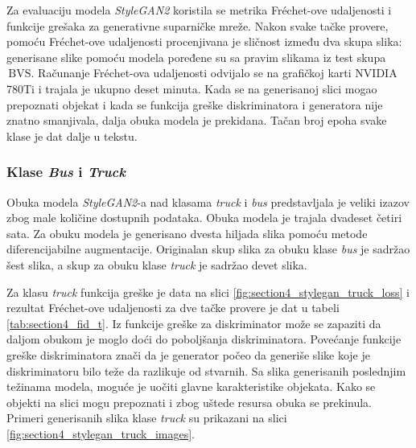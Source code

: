 \documentclass[12pt,oneside]{memoir}
\newcommand{\bvs}{\ensuremath{\,\textrm{BVS}}}
\begin{document}
Za evaluaciju modela \textit{StyleGAN2} koristila se metrika Fréchet-ove udaljenosti i funkcije grešaka za generativne suparničke mreže. Nakon svake tačke provere, pomoću Fréchet-ove udaljenosti procenjivana je sličnost između dva skupa slika: generisane slike pomoću modela poređene su sa pravim slikama iz test skupa \bvs. Računanje Fréchet-ova udaljenosti odvijalo se na grafičkoj karti NVIDIA 780Ti i trajala je ukupno deset minuta. Kada se na generisanoj slici mogao prepoznati objekat i kada se funkcija greške diskriminatora i generatora nije znatno smanjivala, dalja obuka modela je prekidana. Tačan broj epoha svake klase je dat dalje u tekstu.


\subsubsection{Klase \textit{Bus} i \textit{Truck}}

Obuka modela \textit{StyleGAN2}-a nad klasama \textit{truck} i \textit{bus} predstavljala je veliki izazov zbog male količine dostupnih podataka. 
Obuka modela je trajala dvadeset četiri sata. Za obuku modela je generisano dvesta hiljada slika pomoću metode diferencijabilne augmentacije. Originalan skup slika za obuku klase \textit{bus} je sadržao šest slika, a skup za obuku klase \textit{truck} je sadržao devet slika.


\clearpage
Za klasu \textit{truck} funkcija greške je data na slici \ref{fig:section4_stylegan_truck_loss} i rezultat Fréchet-ove udaljenosti za dve tačke provere je dat u tabeli \ref{tab:section4_fid_t}. Iz funkcije greške za diskriminator može se zapaziti da daljom obukom je moglo doći do poboljšanja diskriminatora. Povećanje funkcije greške diskriminatora znači da je generator počeo da generiše slike koje je diskriminatoru bilo teže da razlikuje od stvarnih. Sa slika generisanih poslednjim težinama modela, moguće je uočiti glavne karakteristike objekata. Kako se objekti na slici mogu prepoznati i zbog uštede resursa obuka se prekinula. Primeri generisanih slika klase \textit{truck} su prikazani na slici \ref{fig:section4_stylegan_truck_images}.
\end{document}
